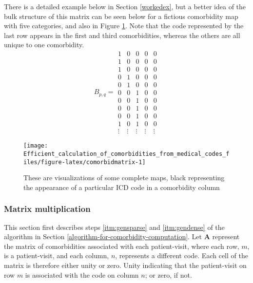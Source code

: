 \documentclass[article]{jss}
\begin{document}
There is a detailed example below in Section \ref{workedex}, but a
better idea of the bulk structure of this matrix can be seen below for a
fictious comorbidity map with five categories, and also in Figure
\ref{fig:comorbidmatrix}. Note that the code represented by the last row
appears in the first and third comorbidities, whereas the others are all
unique to one comorbidity. \[ B_{p,q} =
\begin{matrix}
1 & 0 & 0 & 0 & 0 \\
1 & 0 & 0 & 0 & 0 \\
1 & 0 & 0 & 0 & 0 \\
0 & 1 & 0 & 0 & 0 \\
0 & 1 & 0 & 0 & 0 \\
0 & 0 & 1 & 0 & 0 \\
0 & 0 & 1 & 0 & 0 \\
0 & 0 & 1 & 0 & 0 \\
0 & 0 & 1 & 0 & 0 \\
1 & 0 & 1 & 0 & 0 \\
\vdots & \vdots & \vdots & \vdots & \vdots
\end{matrix}\]\label{eq:bulk}

\begin{CodeChunk}
\begin{figure}

{\centering \texttt{[image: Efficient\_calculation\_of\_comorbidities\_from\_medical\_codes\_files/figure-latex/comorbidmatrix-1]} 

}

\caption[These are visualizations of some complete maps, black representing the appearance of a particular ICD code in a comorbidity column]{These are visualizations of some complete maps, black representing the appearance of a particular ICD code in a comorbidity column}\label{fig:comorbidmatrix}
\end{figure}
\end{CodeChunk}

\subsubsection{Matrix multiplication}\label{matrix-multiplication}

This section first describes steps \ref{itm:gensparse} and
\ref{itm:gendense} of the algorithm in Section
\ref{algorithm-for-comorbidity-computation}. Let \(\boldsymbol{A}\)
represent the matrix of comorbidities associated with each
patient-visit, where each row, \(m\), is a patient-visit, and each
column, \(n\), represents a different code. Each cell of the matrix is
therefore either unity or zero. Unity indicating that the patient-visit
on row \(m\) is associated with the code on column \(n\); or zero, if
not.
\end{document}
